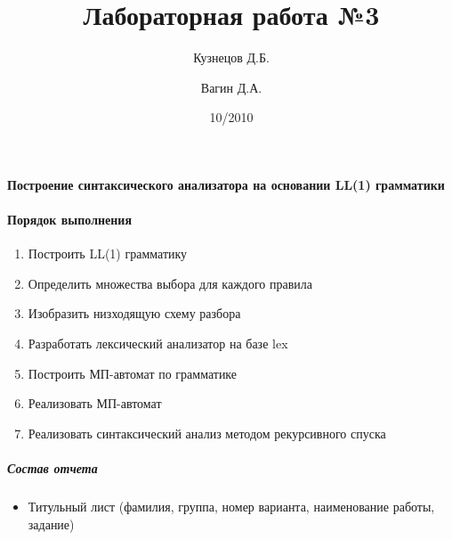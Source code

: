 \documentclass[a4paper,12pt]{article}
\title{Лабораторная работа №3}
\author{Кузнецов Д.Б.\and Вагин Д.А.}
\date{10/2010}
\begin{document}
\paragraph{Построение синтаксического анализатора на основании LL(1) грамматики}

\paragraph{Порядок выполнения}
\begin{enumerate}
	\item Построить LL(1) грамматику
	\item Определить множества выбора для каждого правила
	\item Изобразить низходящую схему разбора
	\item Разработать лексический анализатор на базе lex
	\item Построить МП-автомат по грамматике
	\item Реализовать МП-автомат
	\item Реализовать синтаксический анализ методом рекурсивного спуска	
\end{enumerate}

\subparagraph{Состав отчета}
\begin{itemize}
	\item Титульный лист (фамилия, группа, номер варианта, наименование работы, задание)
\end{itemize}
\end{document}
